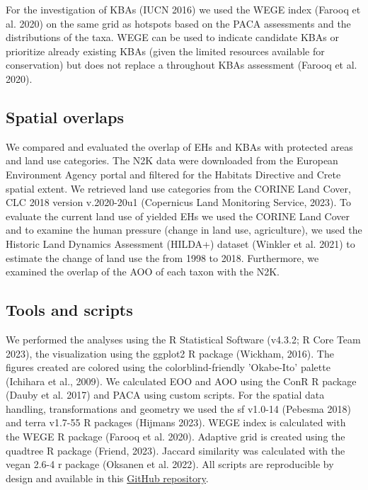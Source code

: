 For the investigation of KBAs (IUCN 2016) we used the WEGE index (Farooq et al. 2020)
on the same grid as hotspots based on the PACA assessments and the distributions
of the taxa. WEGE can be used to indicate candidate KBAs or prioritize already
existing KBAs (given the limited resources available for conservation) but does
not replace a throughout KBAs assessment (Farooq et al. 2020).

    \subsection{Spatial overlaps}
    \label{subsec:arthropods-spatial}
We compared and evaluated the overlap of EHs and KBAs with protected areas and
land use categories. The N2K data were downloaded from the European Environment
Agency portal and filtered for the Habitats Directive and Crete spatial extent.
We retrieved land use categories from the CORINE Land Cover, CLC 2018 version
v.2020-20u1 (Copernicus Land Monitoring Service, 2023).
To evaluate the current land use of yielded EHs we used the CORINE Land Cover
and to examine the human pressure (change in land use, agriculture), we used the
Historic Land Dynamics Assessment (HILDA+) dataset (Winkler et al. 2021) to
estimate the change of land use the from 1998 to 2018. Furthermore, we examined
the overlap of the AOO of each taxon with the N2K.


    \subsection{Tools and scripts}
    \label{subsec:arthropods-tools}
We performed the analyses using the R Statistical Software (v4.3.2; R Core Team 2023),
the visualization using the ggplot2 R package (Wickham, 2016). The figures
created are colored using the colorblind-friendly 'Okabe-Ito' palette (Ichihara et al., 2009).
We calculated EOO and AOO using the ConR R package (Dauby et al. 2017) and PACA
using custom scripts. For the spatial data handling, transformations and
geometry we used the sf v1.0-14 (Pebesma 2018) and terra v1.7-55 R packages (Hijmans 2023).
WEGE index is calculated with the WEGE R package (Farooq et al. 2020).
Adaptive grid is created using the quadtree R package (Friend, 2023).
Jaccard similarity was calculated with the vegan 2.6-4 r package (Oksanen et al. 2022).
All scripts are reproducible by design and available in this 
\href{https://github.com/savvas-paragkamian/arthropoda_assessment_crete}{GitHub repository}.

